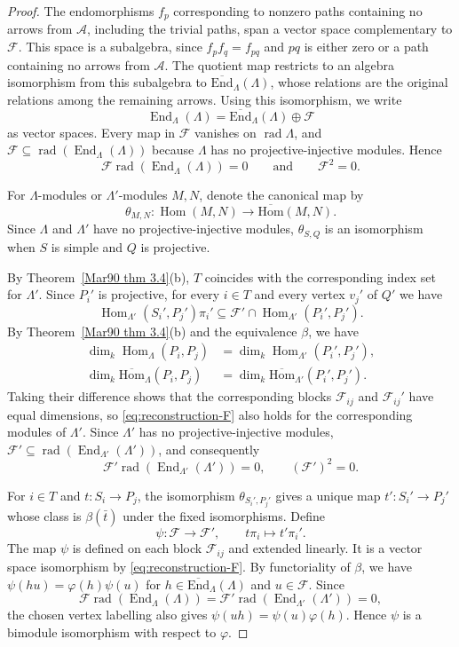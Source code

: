 \documentclass[11pt]{article}
\newcommand{\rad}{\operatorname{rad}}
\newcommand{\Hom}{\operatorname{Hom}}
\newcommand{\End}{\operatorname{End}}
\newcommand{\isHom}{\operatorname{\overline{Hom}}}
\newcommand{\isEnd}{\operatorname{\overline{End}}}
\renewcommand{\cal}[1]{\mathcal #1}   %
\providecommand{\varLambda}{\Lambda}
\theoremstyle{definition}
\begin{document}
\begin{proof}
			The endomorphisms $f_p$ corresponding to nonzero paths containing no arrows from $\cal{A}$, including the trivial paths, span a vector space complementary to $\cal{F}$.
			This space is a subalgebra, since $f_pf_q=f_{pq}$ and $pq$ is either zero or a path containing no arrows from $\cal{A}$.
			The quotient map restricts to an algebra isomorphism from this subalgebra to $\isEnd_{\varLambda}(\varLambda)$, whose relations are the original relations among the remaining arrows.
			Using this isomorphism, we write
			\[
				\End_{\varLambda}(\varLambda)=\isEnd_{\varLambda}(\varLambda)\oplus\cal{F}
			\]
			as vector spaces.
			Every map in $\cal{F}$ vanishes on $\rad\varLambda$, and $\cal{F}\subseteq\rad(\End_{\varLambda}(\varLambda))$ because $\varLambda$ has no projective-injective modules.
			Hence
			\[
				\cal{F}\rad(\End_{\varLambda}(\varLambda))=0\qquad \text{and}\qquad \cal{F}^2=0.
			\]

			For $\varLambda$-modules or $\varLambda'$-modules $M,N$, denote the canonical map by
			\[
				\theta_{M,N}\colon\Hom(M,N)\longrightarrow\isHom(M,N).
			\]
			Since $\varLambda$ and $\varLambda'$ have no  projective-injective modules, $\theta_{S,Q}$ is an isomorphism when $S$ is simple and $Q$ is projective.

			By Theorem~\ref{Mar90 thm 3.4}(b), $T$ coincides with the corresponding index set for $\varLambda'$.
			Since $P_i'$ is projective, for every $i\in T$ and every vertex $v_j'$ of $Q'$ we have
			\[
				\Hom_{\varLambda'}(S_i',P_j')\pi_i'\subseteq \cal{F}'\cap\Hom_{\varLambda'}(P_i',P_j').
			\]
			By Theorem~\ref{Mar90 thm 3.4}(b) and the equivalence $\beta$, we have
			\[
				\begin{aligned}
					\dim_k\Hom_{\varLambda}(P_i,P_j)
					&=\dim_k\Hom_{\varLambda'}(P_i',P_j'),\\
					\dim_k\isHom_{\varLambda}(P_i,P_j)
					&=\dim_k\isHom_{\varLambda'}(P_i',P_j').
				\end{aligned}
			\]
			Taking their difference shows that the corresponding blocks $\cal{F}_{ij}$ and $\cal{F}_{ij}'$ have equal dimensions, so \eqref{eq:reconstruction-F} also holds for the corresponding modules of $\varLambda'$.
			Since $\varLambda'$ has no  projective-injective modules, $\cal{F}'\subseteq \rad(\End_{\varLambda'}(\varLambda'))$, and consequently
			\[
				\cal{F}'\rad(\End_{\varLambda'}(\varLambda'))=0,\qquad (\cal{F}')^2=0.
			\]

			For $i\in T$ and $t:S_i\to P_j$, the isomorphism $\theta_{S_i',P_j'}$ gives a unique map $t':S_i'\to P_j'$ whose class is $\beta(\bar t)$ under the fixed isomorphisms.
			Define
			\[
				\psi\colon\cal{F}\longrightarrow\cal{F}',\qquad t\pi_i\longmapsto t'\pi_i'.
			\]
			The map $\psi$ is defined on each block $\cal F_{ij}$ and extended linearly. It is a vector space isomorphism by \eqref{eq:reconstruction-F}.
			By functoriality of $\beta$, we have $\psi(hu)=\varphi(h)\psi(u)$ for $h\in\isEnd_{\varLambda}(\varLambda)$ and $u\in\cal{F}$.
			Since \[\cal{F}\rad(\End_{\varLambda}(\varLambda))=\cal{F}'\rad(\End_{\varLambda'}(\varLambda'))=0,\] the chosen vertex labelling also gives $\psi(uh)=\psi(u)\varphi(h)$.
			Hence $\psi$ is a bimodule isomorphism with respect to $\varphi$.


\end{proof}
\end{document}
